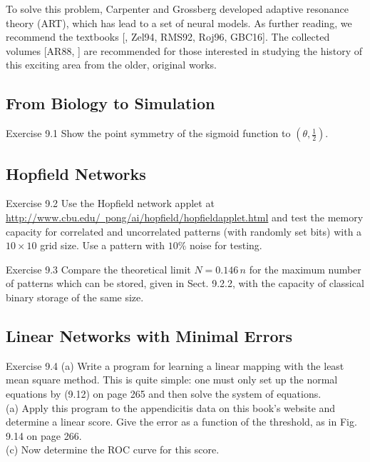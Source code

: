 \documentclass[10pt]{book}
\begin{document}
To solve this problem, Carpenter and Grossberg developed adaptive resonance theory (ART), which has lead to a set of neural models.
As further reading, we recommend the textbooks [\cite{bishop2005neural}, Zel94, RMS92, Roj96, GBC16]. The collected volumes [AR88, \cite{anderson1990neurocomputing}] are recommended for those interested in studying the history of this exciting area from the older, original works.

\subsection{From Biology to Simulation}
Exercise 9.1 Show the point symmetry of the sigmoid function to $\left(\theta, \frac{1}{2}\right)$.

\subsection{Hopfield Networks}
Exercise 9.2 Use the Hopfield network applet at \href{http://www.cbu.edu/~pong/ai/hopfield/hopfieldapplet.html}{http://www.cbu.edu/~pong/ai/hopfield/hopfieldapplet.html} and test the memory capacity for correlated and uncorrelated patterns (with randomly set bits) with a $10 \times 10$ grid size. Use a pattern with $10\%$ noise for testing.

Exercise 9.3 Compare the theoretical limit $N=0.146\,n$ for the maximum number of patterns which can be stored, given in Sect. 9.2.2, with the capacity of classical binary storage of the same size.

\subsection{Linear Networks with Minimal Errors}
Exercise 9.4 (a) Write a program for learning a linear mapping with the least mean square method. This is quite simple: one must only set up the normal equations by (9.12) on page 265 and then solve the system of equations.\\
(a) Apply this program to the appendicitis data on this book's website and determine a linear score. Give the error as a function of the threshold, as in Fig. 9.14 on page 266.\\
(c) Now determine the ROC curve for this score.
\end{document}
